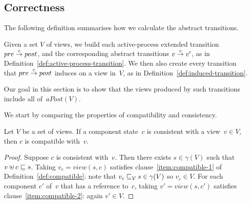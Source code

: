 
\subsection{Correctness}
\label{sec:views-correctness}


The following definition summarises how we calculate the abstract transitions.

\begin{definition}
\label{def:abstract-transition}
Given a set $V$ of views, we build each active-process extended transition
$pre \stackrel{e}\rightarrow post$, and the corresponding abstract transitions $v \stackrel{e}\rightarrow
v'$, as in Definition~\ref{def:active-process-transition}.
%
We then also create every transition that $pre \stackrel{e}\rightarrow post$ induces on a
view in~$V$, as in Definition~\ref{def:induced-transition}. 
\end{definition}
%
Our goal in this section is to show that the views produced by such
transitions include all of~$aPost(V)$. 


We start by comparing the properties of compatibility and consistency.
%
\begin{lemma}
\label{lem:consistent-implies-compatible}
Let $V$ be a set of views.
If a component state~$c$ is consistent with a view~$v \in V$, then
$c$ is compatible with~$v$. 
\end{lemma}
%
\begin{proof}
Suppose $c$ is consistent with~$v$.  Then there exists $s \in \gamma(V)$ such
that $v \uplus c \sqsubseteq s$.  Taking $v_c = view(s, c)$ satisfies
clause~\ref{item:compatible-1} of Definition~\ref{def:compatible}: note that
$v_c \sqsubseteq_{\mathcal{V}} s \in \gamma(V)$ so $v_c \in V$.  For each component $c'$ of~$v$
that has a reference to~$c$, taking $v' = view(s,c')$ satisfies
clause~\ref{item:compatible-2}: again $v' \in V$.
\end{proof}

